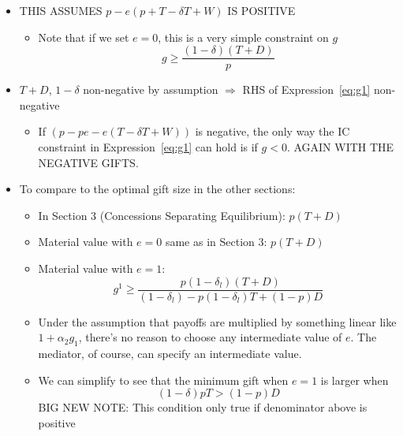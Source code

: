 \documentclass[12pt]{article}
\newcommand{\al}{\alpha}
\newcommand{\de}{\delta}
\begin{document}
						\begin{itemize}
							\item THIS ASSUMES {\color{red} $p - e \left( p + T - \de T + W \right)$ IS POSITIVE}
								\begin{itemize}
									\item Note that if we set $e=0$, this is a very simple constraint on $g$
										\begin{equation}
											g \geq \frac{\left(1 - \de \right) \left( T + D \right)}{p}
											\label{eq:g3}
										\end{equation}
								\end{itemize}
							\item $T+D$, $1 - \de $ non-negative by assumption $\Rightarrow$ RHS of Expression~\ref{eq:g1} non-negative
								\begin{itemize}
									\item If $\left(p - pe - e \left( T - \de T + W \right) \right)$ is negative, the only way the IC constraint in Expression~\ref{eq:g1} can hold is if $g<0$. AGAIN WITH THE NEGATIVE GIFTS.
								\end{itemize}
							\item To compare to the optimal gift size in the other sections:
								\begin{itemize}
									\item In Section 3 (Concessions Separating Equilibrium): $p\left(T+D\right)$
									\item Material value with $e=0$ same as in Section 3: $p\left(T+D\right)$
									\item Material value with $e=1$:
										\begin{equation}
											g^1 \geq \frac{p(1-\de_l)(T + D)}{\left(1-\de_l \right) -p(1-\de_l)T +(1-p)D}
											\label{eq:g4}
										\end{equation}
									\item Under the assumption that payoffs are multiplied by something linear like $1 + \al_2 g_1$, there's no reason to choose any intermediate value of $e$. The mediator, of course, can specify an intermediate value.
									\item We can simplify to see that the minimum gift when $e=1$ is larger when
										\[
											(1-\de)pT > (1-p)D
										\]
										\color{red} BIG NEW NOTE: This condition only true if denominator above is positive
								\end{itemize}
						\end{itemize}
				
\end{document}
